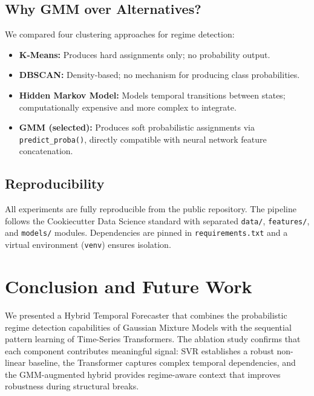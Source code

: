 \documentclass[conference, 10pt]{IEEEtran}
\begin{document}
\subsection{Why GMM over Alternatives?}

We compared four clustering approaches for regime detection:

\begin{itemize}
    \item \textbf{K-Means:} Produces hard assignments only; no probability output.
    \item \textbf{DBSCAN:} Density-based; no mechanism for producing class probabilities.
    \item \textbf{Hidden Markov Model:} Models temporal transitions between states; computationally expensive and more complex to integrate.
    \item \textbf{GMM (selected):} Produces soft probabilistic assignments via \texttt{predict\_proba()}, directly compatible with neural network feature concatenation.
\end{itemize}

\subsection{Reproducibility}
All experiments are fully reproducible from the public repository. The pipeline follows the Cookiecutter Data Science standard with separated \texttt{data/}, \texttt{features/}, and \texttt{models/} modules. Dependencies are pinned in \texttt{requirements.txt} and a virtual environment (\texttt{venv}) ensures isolation.

\section{Conclusion and Future Work}

We presented a Hybrid Temporal Forecaster that combines the probabilistic regime detection capabilities of Gaussian Mixture Models with the sequential pattern learning of Time-Series Transformers. The ablation study confirms that each component contributes meaningful signal: SVR establishes a robust non-linear baseline, the Transformer captures complex temporal dependencies, and the GMM-augmented hybrid provides regime-aware context that improves robustness during structural breaks.
\end{document}
